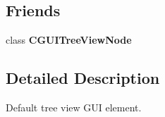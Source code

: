 \subsection*{Friends}
\begin{DoxyCompactItemize}
\item 
\hypertarget{classirr_1_1gui_1_1_c_g_u_i_tree_view_a2b8fd57164b3201992c6ec48a9a19802}{class {\bfseries C\-G\-U\-I\-Tree\-View\-Node}}\label{classirr_1_1gui_1_1_c_g_u_i_tree_view_a2b8fd57164b3201992c6ec48a9a19802}

\end{DoxyCompactItemize}


\subsection{Detailed Description}
Default tree view G\-U\-I element. 

